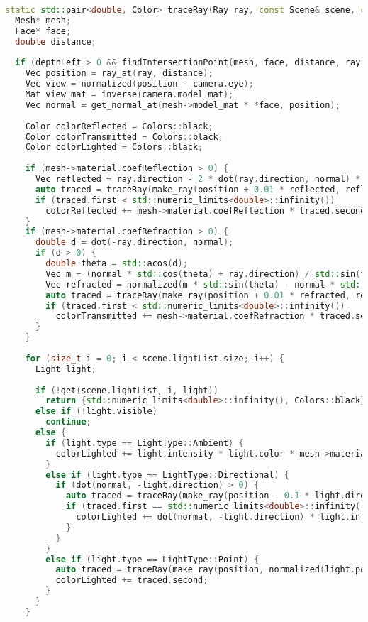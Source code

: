 \begin{lstlisting}[language=C++]
static std::pair<double, Color> traceRay(Ray ray, const Scene& scene, const Camera& camera, int depthLeft) {
  Mesh* mesh;
  Face* face;
  double distance;
  
  if (depthLeft > 0 && findIntersectionPoint(mesh, face, distance, ray, scene)) {
    Vec position = ray_at(ray, distance);
    Vec view = normalized(position - camera.eye);
    Mat view_mat = inverse(camera.model_mat);
    Vec normal = get_normal_at(mesh->model_mat * *face, position);
    
    Color colorReflected = Colors::black;
    Color colorTransmitted = Colors::black;
    Color colorLighted = Colors::black;
    
    if (mesh->material.coefReflection > 0) {
      Vec reflected = ray.direction - 2 * dot(ray.direction, normal) * normal;
      auto traced = traceRay(make_ray(position + 0.01 * reflected, reflected), scene, camera, depthLeft - 1);
      if (traced.first < std::numeric_limits<double>::infinity())
        colorReflected += mesh->material.coefReflection * traced.second;
    }
    if (mesh->material.coefRefraction > 0) {
      double d = dot(-ray.direction, normal);
      if (d > 0) {
        double theta = std::acos(d);
        Vec m = (normal * std::cos(theta) + ray.direction) / std::sin(theta);
        Vec refracted = normalized(m * std::sin(theta) - normal * std::cos(theta));
        auto traced = traceRay(make_ray(position + 0.01 * refracted, refracted), scene, camera, depthLeft - 1);
        if (traced.first < std::numeric_limits<double>::infinity())
          colorTransmitted += mesh->material.coefRefraction * traced.second;
      }
    }
    
    for (size_t i = 0; i < scene.lightList.size; i++) {
      Light light;
  
      if (!get(scene.lightList, i, light))
        return {std::numeric_limits<double>::infinity(), Colors::black};
      else if (!light.visible)
        continue;
      else {
        if (light.type == LightType::Ambient) {
          colorLighted += light.intensity * light.color * mesh->material.ambientColor;
        }
        else if (light.type == LightType::Directional) {
          if (dot(normal, -light.direction) > 0) {
            auto traced = traceRay(make_ray(position - 0.1 * light.direction, -light.direction), scene, camera, depthLeft - 1);
            if (traced.first == std::numeric_limits<double>::infinity()) {
              colorLighted += dot(normal, -light.direction) * light.intensity * light.color;
            }
          }
        }
        else if (light.type == LightType::Point) {
          auto traced = traceRay(make_ray(position, normalized(light.position - position)), scene, camera, depthLeft - 1);
          colorLighted += traced.second;
        }
      }
    }
    

\end{lstlisting}
